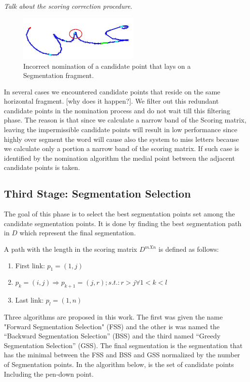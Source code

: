 \documentclass[journal,compsoc]{IEEEtran}
\begin{document}
\emph{Talk about the scoring correction procedure}.

\begin{figure}[h]
\centering
\includegraphics[width=6cm]{./figures/candidate_in_no_horizontal}
\caption{Incorrect nomination of a candidate point that lays on a Segmentation fragment.}
\label{fig:candidate_in_no_horizontal}
\end{figure}

In several cases we encountered candidate points that reside on the same horizontal fragment. [why does it happen?]. We filter out this redundant candidate points in the nomination process and do not wait till this filtering phase. The reason is that since we calculate a narrow band of the Scoring matrix, leaving the impermissible candidate points will result in low performance since highly over segment the word will cause also the system to miss letters because we calculate only a portion a narrow band of the scoring matrix. If such case is identified by the nomination algorithm the medial point between the adjacent candidate points is taken.

\subsection{Third  Stage: Segmentation Selection}
The goal of this phase is to select the best segmentation points set among the candidate segmentation points. It is done by finding the best segmentation path in $D$ which represent the final segmentation. 
 
A path with the length in the scoring matrix $D^{mXn}$ is defined as follows:  
\begin{enumerate}
\item First link: $p_{1}=(1,j)$
\item $p_{k}=(i,j)\Rightarrow p_{k+1}=(j,r);s.t.:r>j \forall 1<k<l $
\item Last link: $p_{l}=(1,n)$
\end{enumerate}
Three algorithms are proposed in this work. The first was given the name "Forward Segmentation Selection" (FSS) and the other is was named the “Backward Segmentation Selection” (BSS) and the third named “Greedy Segmentation Selection” (GSS). The final segmentation is the segmentation that has the minimal between the FSS and BSS and GSS normalized by the number of Segmentation points. In the algorithm below, is the set of candidate points Including the pen-down point.  
\end{document}

